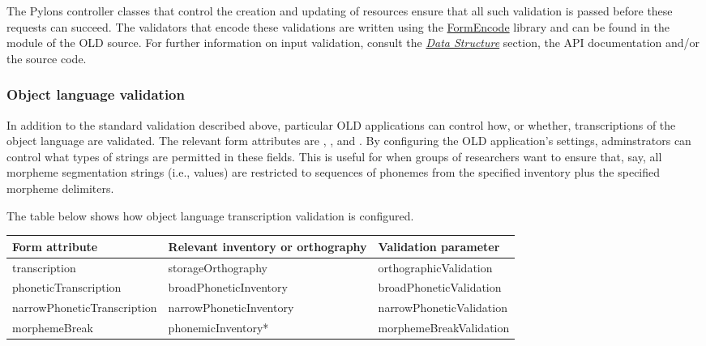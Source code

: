 \documentclass[letterpaper,10pt,english]{sphinxmanual}
\begin{document}
The Pylons controller classes that control the creation and updating of
resources ensure that all such validation is passed before these requests can
succeed.  The validators that encode these validations are written using the
\href{http://www.formencode.org}{FormEncode} library and can be found in the
 module of the OLD source.  For further information on input
validation, consult the {\hyperref[datastructure:data-structure]{\emph{Data Structure}}} section, the API documentation
and/or the source code.


\subsubsection{Object language validation}
\label{interface:object-language-validation}\label{interface:id17}
In addition to the standard validation described above, particular OLD
applications can control how, or whether, transcriptions of the object language
are validated.  The relevant form attributes are ,
,  and
.  By configuring the OLD application's settings, adminstrators
can control what types of strings are permitted in these fields.  This is useful
for when groups of researchers want to ensure that, say, all morpheme
segmentation strings (i.e.,  values) are restricted to
sequences of phonemes from the specified inventory plus the specified morpheme
delimiters.

The table below shows how object language transcription validation is
configured.

\begin{tabulary}{\linewidth}{|L|L|L|}
\hline
\textbf{
Form attribute
} & \textbf{
Relevant inventory or orthography
} & \textbf{
Validation parameter
}\\\hline

transcription
 & 
storageOrthography
 & 
orthographicValidation
\\\hline

phoneticTranscription
 & 
broadPhoneticInventory
 & 
broadPhoneticValidation
\\\hline

narrowPhoneticTranscription
 & 
narrowPhoneticInventory
 & 
narrowPhoneticValidation
\\\hline

morphemeBreak
 & 
phonemicInventory*
 & 
morphemeBreakValidation
\\\hline
\end{tabulary}
\end{document}
